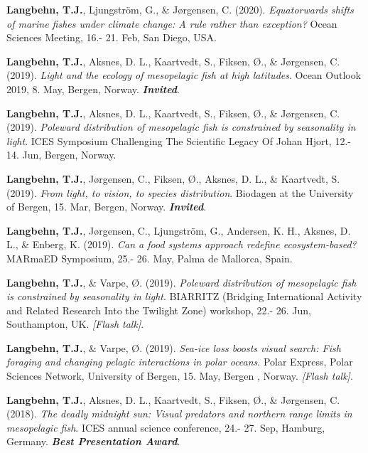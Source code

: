 \documentclass[11pt, a4paper]{awesome-cv}
\begin{document}
\leavevmode\hypertarget{ref-Langbehn11}{}%
\textbf{Langbehn, T.J.}, Ljungström, G., \& Jørgensen, C. (2020).
\emph{Equatorwards shifts of marine fishes under climate change: A rule
rather than exception?} Ocean Sciences Meeting, 16.- 21. Feb, San Diego,
USA.

\leavevmode\hypertarget{ref-Langbehn6}{}%
\textbf{Langbehn, T.J.}, Aksnes, D. L., Kaartvedt, S., Fiksen, Ø., \&
Jørgensen, C. (2019). \emph{Light and the ecology of mesopelagic fish at
high latitudes}. Ocean Outlook 2019, 8. May, Bergen, Norway.
\emph{\textbf{Invited}}.

\leavevmode\hypertarget{ref-Langbehn9}{}%
\textbf{Langbehn, T.J.}, Aksnes, D. L., Kaartvedt, S., Fiksen, Ø., \&
Jørgensen, C. (2019). \emph{Poleward distribution of mesopelagic fish is
constrained by seasonality in light}. ICES Symposium Challenging The
Scientific Legacy Of Johan Hjort, 12.- 14. Jun, Bergen, Norway.

\leavevmode\hypertarget{ref-Langbehn5}{}%
\textbf{Langbehn, T.J.}, Jørgensen, C., Fiksen, Ø., Aksnes, D. L., \&
Kaartvedt, S. (2019). \emph{From light, to vision, to species
distribution}. Biodagen at the University of Bergen, 15. Mar, Bergen,
Norway. \emph{\textbf{Invited}}.

\leavevmode\hypertarget{ref-Langbehn8}{}%
\textbf{Langbehn, T.J.}, Jørgensen, C., Ljungström, G., Andersen, K. H.,
Aksnes, D. L., \& Enberg, K. (2019). \emph{Can a food systems approach
redefine ecosystem-based?} MARmaED Symposium, 25.- 26. May, Palma de
Mallorca, Spain.

\leavevmode\hypertarget{ref-Langbehn10}{}%
\textbf{Langbehn, T.J.}, \& Varpe, Ø. (2019). \emph{Poleward
distribution of mesopelagic fish is constrained by seasonality in
light}. BIARRITZ (Bridging International Activity and Related Research
Into the Twilight Zone) workshop, 22.- 26. Jun, Southampton, UK.
\emph{{[}Flash talk{]}}.

\leavevmode\hypertarget{ref-Langbehn7}{}%
\textbf{Langbehn, T.J.}, \& Varpe, Ø. (2019). \emph{Sea-ice loss boosts
visual search: Fish foraging and changing pelagic interactions in polar
oceans}. Polar Express, Polar Sciences Network, University of Bergen,
15. May, Bergen , Norway. \emph{{[}Flash talk{]}}.

\leavevmode\hypertarget{ref-Langbehn4}{}%
\textbf{Langbehn, T.J.}, Aksnes, D. L., Kaartvedt, S., Fiksen, Ø., \&
Jørgensen, C. (2018). \emph{The deadly midnight sun: Visual predators
and northern range limits in mesopelagic fish}. ICES annual science
conference, 24.- 27. Sep, Hamburg, Germany. \emph{\textbf{Best
Presentation Award}}.
\end{document}
